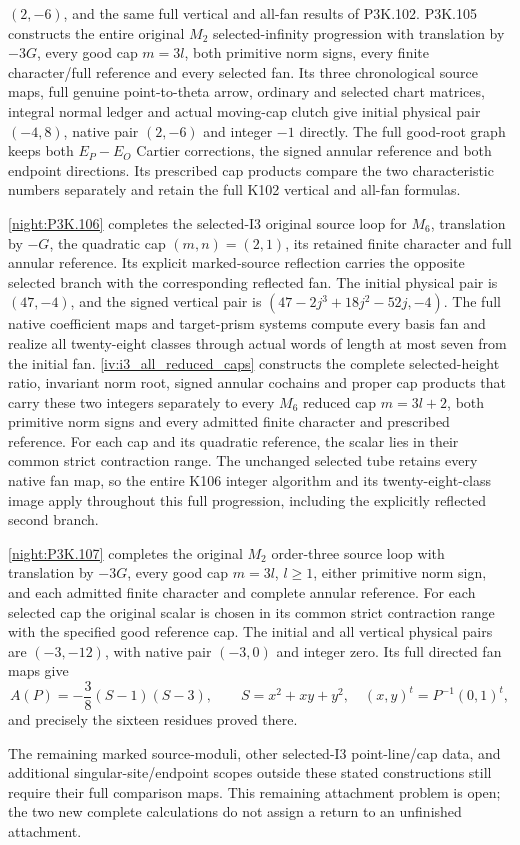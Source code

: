 \begin{theorem}
\((2,-6)\), and the same full vertical and all-fan results
of P3K.102. P3K.105 constructs the entire original
\(M_2\) selected-infinity progression with translation by
\(-3G\), every good cap \(m=3l\), both primitive norm
signs, every finite character/full reference and every
selected fan. Its three chronological source maps, full
genuine point-to-theta arrow, ordinary and selected chart
matrices, integral normal ledger and actual moving-cap
clutch give initial physical pair \((-4,8)\), native
pair \((2,-6)\) and integer \(-1\) directly. The full
good-root graph keeps both \(E_P-E_O\) Cartier corrections,
the signed annular reference and both endpoint directions.
Its prescribed cap products compare the two characteristic
numbers separately and retain the full K102 vertical and
all-fan formulas.

\cref{night:P3K.106} completes the selected-I3 original source
loop for \(M_6\), translation by \(-G\), the quadratic cap
\((m,n)=(2,1)\), its retained finite character and full annular
reference. Its explicit marked-source reflection carries the
opposite selected branch with the corresponding reflected fan.
The initial physical pair is \((47,-4)\), and the signed vertical
pair is \((47-2j^3+18j^2-52j,-4)\). The full native coefficient
maps and target-prism systems compute every basis fan and realize
all twenty-eight classes through actual words of length at most
seven from the initial fan. \cref{iv:i3_all_reduced_caps} constructs the complete
selected-height ratio, invariant norm root, signed annular cochains
and proper cap products that carry these two integers separately
to every \(M_6\) reduced cap \(m=3l+2\), both primitive norm
signs and every admitted finite character and prescribed reference.
For each cap and its quadratic reference, the scalar lies in their
common strict contraction range. The unchanged selected tube retains
every native fan map, so the entire K106 integer algorithm and its
twenty-eight-class image apply throughout this full progression,
including the explicitly reflected second branch.

\cref{night:P3K.107} completes the original \(M_2\) order-three
source loop with translation by \(-3G\), every good cap
\(m=3l\), \(l\geq1\), either primitive norm sign, and each
admitted finite character and complete annular reference.
For each selected cap the original scalar is chosen in its common
strict contraction range with the specified good reference cap.
The initial and all vertical physical pairs are \((-3,-12)\),
with native pair \((-3,0)\) and integer zero. Its full directed
fan maps give
\[
 A(P)=-\frac38(S-1)(S-3),\qquad
 S=x^2+xy+y^2,\quad (x,y)^t=P^{-1}(0,1)^t,
\]
and precisely the sixteen residues proved there.

The remaining marked source-moduli, other selected-I3 point-line/cap data, and
additional singular-site/endpoint scopes outside these stated
constructions still require their full comparison maps. This
remaining attachment problem is open; the two new complete
calculations do not assign a return to an unfinished attachment.
\end{theorem}
